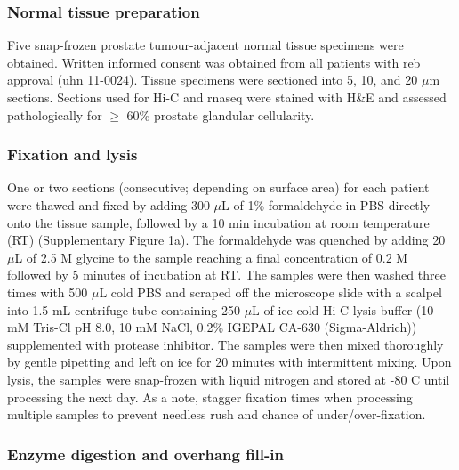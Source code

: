 \subsubsection{Normal tissue preparation}

Five snap-frozen prostate tumour-adjacent normal tissue specimens were obtained.
Written informed consent was obtained from all patients with \gls{reb} approval (\gls{uhn} 11-0024).
Tissue specimens were sectioned into 5, 10, and 20 $\mu$m sections.
Sections used for Hi-C and \gls{rnaseq} were stained with H\&E and assessed pathologically for $\ge$ 60\% prostate glandular cellularity.

\subsubsection{Fixation and lysis}

One or two sections (consecutive; depending on surface area) for each patient were thawed and fixed by adding 300 $\mu$L of 1\% formaldehyde in PBS directly onto the tissue sample, followed by a 10 min incubation at room temperature (RT) (Supplementary Figure 1a).
The formaldehyde was quenched by adding 20 $\mu$L of 2.5 M glycine to the sample reaching a final concentration of 0.2 M followed by 5 minutes of incubation at RT.
The samples were then washed three times with 500 $\mu$L cold PBS and scraped off the microscope slide with a scalpel into 1.5 mL centrifuge tube containing 250 $\mu$L of ice-cold Hi-C lysis buffer (10 mM Tris-Cl pH 8.0, 10 mM NaCl, 0.2\% IGEPAL CA-630 (Sigma-Aldrich)) supplemented with protease inhibitor.
The samples were then mixed thoroughly by gentle pipetting and left on ice for 20 minutes with intermittent mixing.
Upon lysis, the samples were snap-frozen with liquid nitrogen and stored at -80 \textdegree C until processing the next day.
As a note, stagger fixation times when processing multiple samples to prevent needless rush and chance of under/over-fixation.

\subsubsection{Enzyme digestion and overhang fill-in}

